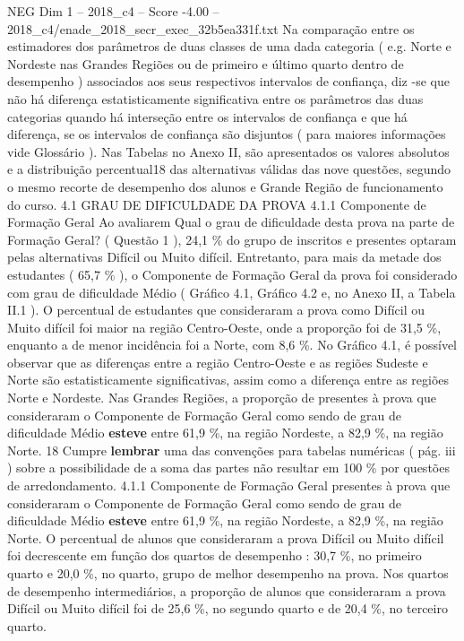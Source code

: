 \begin{textsample}{NEG Dim 1 – 2018\_c4 – Score -4.00 – 2018\_c4/enade\_2018\_secr\_exec\_32b5ea331f.txt}
Na comparação entre os estimadores dos parâmetros de duas classes de uma dada categoria ( e.g.
Norte e Nordeste nas Grandes Regiões ou de primeiro e último quarto dentro de desempenho ) associados aos seus respectivos intervalos de confiança, diz -se que não há diferença estatisticamente significativa entre os parâmetros das duas categorias quando há interseção entre os intervalos de confiança e que há diferença, se os intervalos de confiança são disjuntos ( para maiores informações vide Glossário ).
Nas Tabelas no Anexo II, são apresentados os valores absolutos e a distribuição percentual18 das alternativas válidas das nove questões, segundo o mesmo recorte de desempenho dos alunos e Grande Região de funcionamento do curso. 4.1 GRAU DE DIFICULDADE DA PROVA 4.1.1 Componente de Formação Geral Ao avaliarem Qual o grau de dificuldade desta prova na parte de Formação Geral? ( Questão 1 ), 24,1 \% do grupo de inscritos e presentes optaram pelas alternativas Difícil ou Muito difícil.
Entretanto, para mais da metade dos estudantes ( 65,7 \% ), o Componente de Formação Geral da prova foi considerado com grau de dificuldade Médio ( Gráfico 4.1, Gráfico 4.2 e, no Anexo II, a Tabela II.1 ).
O percentual de estudantes que consideraram a prova como Difícil ou Muito difícil foi maior na região Centro-Oeste, onde a proporção foi de 31,5 \%, enquanto a de menor incidência foi a Norte, com 8,6 \%.
No Gráfico 4.1, é possível observar que as diferenças entre a região Centro-Oeste e as regiões Sudeste e Norte são estatisticamente significativas, assim como a diferença entre as regiões Norte e Nordeste.
Nas Grandes Regiões, a proporção de presentes à prova que consideraram o Componente de Formação Geral como sendo de grau de dificuldade Médio \textbf{esteve} entre 61,9 \%, na região Nordeste, a 82,9 \%, na região Norte. 18 Cumpre \textbf{lembrar} uma das convenções para tabelas numéricas ( pág. iii ) sobre a possibilidade de a soma das partes não resultar em 100 \% por questões de arredondamento. 4.1.1 Componente de Formação Geral presentes à prova que consideraram o Componente de Formação Geral como sendo de grau de dificuldade Médio \textbf{esteve} entre 61,9 \%, na região Nordeste, a 82,9 \%, na região Norte.
O percentual de alunos que consideraram a prova Difícil ou Muito difícil foi decrescente em função dos quartos de desempenho : 30,7 \%, no primeiro quarto e 20,0 \%, no quarto, grupo de melhor desempenho na prova.
Nos quartos de desempenho intermediários, a proporção de alunos que consideraram a prova Difícil ou Muito difícil foi de 25,6 \%, no segundo quarto e de 20,4 \%, no terceiro quarto.

\end{textsample}
